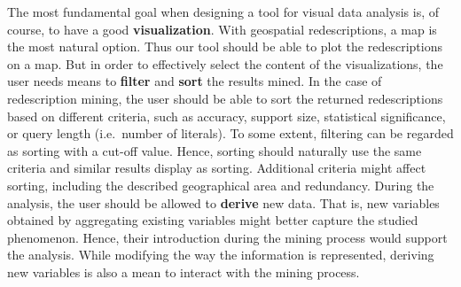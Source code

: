  The most fundamental goal when designing a
tool for visual data analysis is, of course, to have a good
\textbf{visualization}. With geospatial redescriptions, a map is the
most natural option. Thus our tool should be able to plot the
redescriptions on a map. But in order to effectively select the
content of the visualizations, the user needs means to \textbf{filter}
and \textbf{sort} the results mined. In the case of redescription
mining, the user should be able to sort the returned redescriptions
based on different criteria, such as accuracy, support size,
statistical significance, or query length (i.e.\ number of literals).
To some extent, filtering can be regarded as sorting with a cut-off
value. Hence, sorting should naturally use the same criteria and
similar results display as sorting. Additional criteria might affect
sorting, including the described geographical area and redundancy.
During the analysis, the user should be allowed to \textbf{derive} new
data. That is, new variables obtained by aggregating existing
variables might better capture the studied phenomenon. Hence, their
introduction during the mining process would support the
analysis. While modifying the way the information is represented,
deriving new variables is also a mean to interact with the mining
process.

